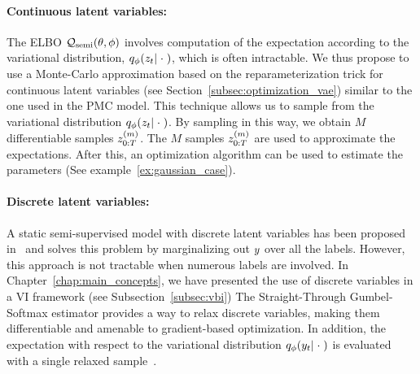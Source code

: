 \paragraph*{Continuous latent variables: } 
The ELBO $\mathcal{Q}_{\mathrm{semi}}(\theta,\phi)$
involves computation of the expectation according to 
the variational distribution,
$q_\phi(z_{t}|\;\cdot \;)$,
which is often intractable.
We thus propose to use a Monte-Carlo approximation based on the reparameterization 
trick for continuous latent variables (see Section~\ref{subsec:optimization_vae}) 
similar to the one used in the PMC model.
This technique allows us to sample from the variational distribution
$q_\phi(z_{t}|\; \cdot \;)$.
By sampling in this way, we obtain $M$ differentiable samples 
$z_{0:T}^{(m)}$. 
The $M$ samples $z_{0:T}^{(m)}$ are used to approximate the expectations. After this, 
an optimization algorithm can be used to estimate the parameters
(See example~\ref{ex:gaussian_case}).\\

\paragraph*{Discrete latent variables: } 
A static semi-supervised model with discrete latent variables 
has been proposed in~\citep{kingma2014semi} and solves this problem by
marginalizing out $y$ over all the labels. 
However, this approach is not tractable
when numerous labels are involved.
In Chapter~\ref{chap:main_concepts},
we have presented  the use of discrete variables 
in a VI framework (see Subsection~\ref{subsec:vbi})
The  Straight-Through Gumbel-Softmax estimator provides a way to relax discrete variables, 
making them differentiable and amenable to gradient-based optimization. 
In addition, the expectation with respect to the variational distribution
$q_\phi(y_t|\; \cdot \;)$ is evaluated with a single relaxed 
sample~\citep{andriyash2018improved,jang2016categorical}.\\



